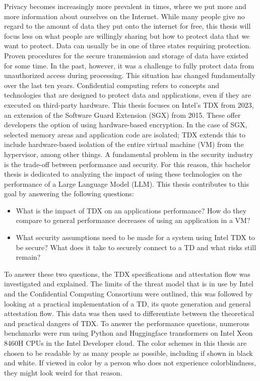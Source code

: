 Privacy becomes increasingly more prevalent in times, where we put more and more information about ourselves on the Internet. While many people give no regard to the amount of data they put onto the internet for free, this thesis will focus less on what people are willingly sharing but how to protect data that we want to protect. Data can usually be in one of three states requiring protection. Proven procedures for the secure transmission and storage of data have existed for some time. In the past, however, it was a challenge to fully protect data from unauthorized access during processing. This situation has changed fundamentally over the last ten years. Confidential computing refers to concepts and technologies that are designed to protect data and applications, even if they are executed on third-party hardware. This thesis focuses on Intel's \Gls{TDX} from 2023, an extension of the Software Guard Extension (SGX) from 2015. These offer developers the option of using hardware-based encryption. In the case of SGX, selected memory areas and application code are isolated; \Gls{TDX} extends this to include hardware-based isolation of the entire virtual machine (VM) from the hypervisor, among other things. 
A fundamental problem in the security industry is the trade-off between performance and security. For this reason, this bachelor thesis is dedicated to analyzing the impact of using these technologies on the performance of a Large Language Model (LLM). This thesis contributes to this goal by answering the following questions:
\begin{itemize}
    \item What is the impact of \Gls{TDX} on an applications performance? How do they compare to general performance decreases of using an application in a VM?
\item What security assumptions need to be made for a system using Intel \Gls{TDX} to be secure? What does it take to securely connect to a TD and what risks still remain?
\end{itemize}
To answer these two questions, the \Gls{TDX} specifications and attestation flow was investigated and explained. The limits of the threat model that is in use by Intel and the Confidential Computing Consortium were outlined, this was followed by looking at a practical implementation of a TD, its quote generation and general attestation flow. This data was then used to differentiate between the theoretical and practical dangers of \Gls{TDX}.
To answer the performance questions, numerous benchmarks were run using Python and Huggingface transformers on Intel Xeon 8460H CPUs in the Intel Developer cloud.
The color schemes in this thesis are chosen to be readable by as many people as possible, including if shown in black and white. If viewed in color by a person who does not experience colorblindness, they might look weird for that reason.
